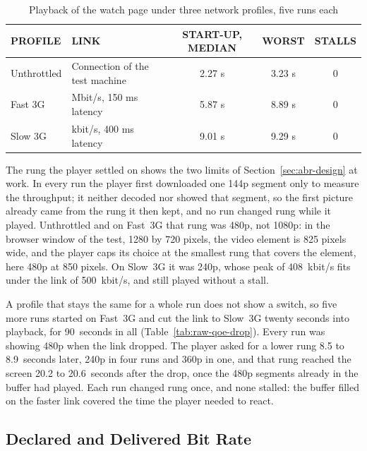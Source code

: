 \begin{table}[H]
\centering
\caption{Playback of the watch page under three network profiles, five runs each}
\label{tab:qoe-playback}
\small
\begin{tabularx}{\textwidth}{>{\raggedright\arraybackslash}p{} >{\raggedright\arraybackslash}X c c c}
\toprule
\textbf{PROFILE} & \textbf{LINK} & \textbf{START-UP, MEDIAN} & \textbf{WORST} & \textbf{STALLS} \\
\midrule
Unthrottled & Connection of the test machine & 2.27 s & 3.23 s & 0 \\
Fast 3G & 1.6 Mbit/s, 150 ms latency & 5.87 s & 8.89 s & 0 \\
Slow 3G & 500 kbit/s, 400 ms latency & 9.01 s & 9.29 s & 0 \\
\bottomrule
\end{tabularx}
\end{table}

The rung the player settled on shows the two limits of Section~\ref{sec:abr-design} at work. In every
run the player first downloaded one 144p segment only to measure the throughput; it neither decoded
nor showed that segment, so the first picture already came from the rung it then kept, and no run
changed rung while it played. Unthrottled
and on Fast~3G that rung was 480p, not 1080p: in the browser window of the test, 1280 by 720 pixels,
the video element is 825 pixels wide, and the player caps its choice at the smallest rung that
covers the element, here 480p at 850 pixels. On Slow~3G it was 240p,
whose peak of 408~kbit/s fits under the link of 500~kbit/s, and still played without a stall.

A profile that stays the same for a whole run does not show a switch, so five more runs started on
Fast~3G and cut the link to Slow~3G twenty seconds into playback, for 90~seconds in all
(Table~\ref{tab:raw-qoe-drop}). Every run was showing 480p when the link dropped. The player asked
for a lower rung 8.5 to 8.9~seconds later, 240p in four runs and 360p in one, and that rung reached
the screen 20.2 to 20.6~seconds after the drop, once the 480p segments already in the buffer had
played. Each run changed rung once, and none stalled: the buffer filled on the faster link covered
the time the player needed to react.

\subsection{Declared and Delivered Bit Rate}
\label{sec:bitrate-evaluation}

